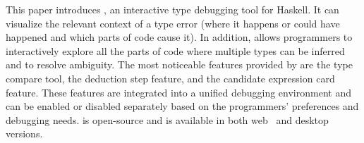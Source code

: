 This paper introduces \chameleon{}, an interactive type debugging tool for Haskell. It can visualize the relevant context of a type error (where it happens or could have happened and which parts of code cause it). In addition, \chameleon{} allows programmers to interactively explore all the parts of code where multiple types can be inferred and to resolve ambiguity. The most noticeable features provided by \chameleon{} are the type compare tool, the deduction step feature, and the candidate expression card feature. These features are integrated into a unified debugging environment and can be enabled or disabled separately based on the programmers' preferences and debugging needs. \chameleon{} is open-source and is available in both web~\cite{shuai_fu_chameleon_2022} and desktop versions.  




